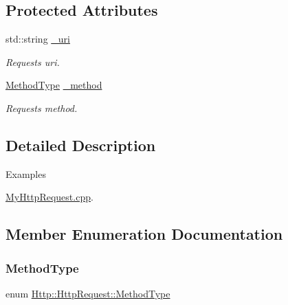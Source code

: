 \subsection*{Protected Attributes}
\begin{DoxyCompactItemize}
\item 
\mbox{\label{classHttp_1_1HttpRequest_aceccafdd771528257ee184d1e8e63acd}} 
std\+::string \mbox{\hyperlink{classHttp_1_1HttpRequest_aceccafdd771528257ee184d1e8e63acd}{\+\_\+uri}}
\begin{DoxyCompactList}\small\item\em Request\textquotesingle{}s uri. \end{DoxyCompactList}\item 
\mbox{\label{classHttp_1_1HttpRequest_a0de6a3b0ddd11cb12e278c287fc72074}} 
\mbox{\hyperlink{classHttp_1_1HttpRequest_a81e0eff01101e40ca91a87b25f4ce6a9}{Method\+Type}} \mbox{\hyperlink{classHttp_1_1HttpRequest_a0de6a3b0ddd11cb12e278c287fc72074}{\+\_\+method}}
\begin{DoxyCompactList}\small\item\em Request\textquotesingle{}s method. \end{DoxyCompactList}\end{DoxyCompactItemize}


\subsection{Detailed Description}
\begin{Desc}
\item[Examples]\par
\mbox{\hyperlink{MyHttpRequest_8cpp-example}{My\+Http\+Request.\+cpp}}.\end{Desc}


\subsection{Member Enumeration Documentation}
\mbox{\label{classHttp_1_1HttpRequest_a81e0eff01101e40ca91a87b25f4ce6a9}} 
\subsubsection{\texorpdfstring{MethodType}{MethodType}}
{\footnotesize\ttfamily enum \mbox{\hyperlink{classHttp_1_1HttpRequest_a81e0eff01101e40ca91a87b25f4ce6a9}{Http\+::\+Http\+Request\+::\+Method\+Type}}\hspace{0.3cm}{\ttfamily [strong]}}

